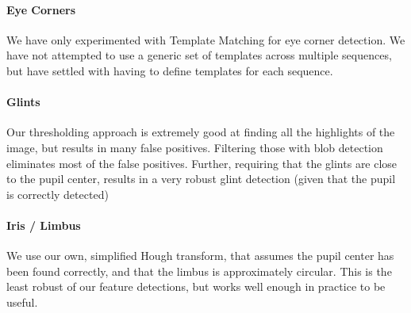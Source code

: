 \documentclass[a4paper,11pt]{article}
\begin{document}
\paragraph{Eye Corners}
We have only experimented with Template Matching for eye corner detection. We have not attempted to use a generic set of templates across multiple sequences, but have settled with having to define templates for each sequence.

\paragraph{Glints}
Our thresholding approach is extremely good at finding all the highlights of the image, but results in many false positives. Filtering those with blob detection eliminates most of the false positives. Further, requiring that the glints are close to the pupil center, results in a very robust glint detection (given that the pupil is correctly detected)

\paragraph{Iris / Limbus}
We use our own, simplified Hough transform, that assumes the pupil center has been found correctly, and that the limbus is approximately circular. This is the least robust of our feature detections, but works well enough in practice to be useful.
\end{document}
